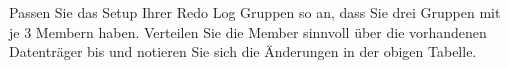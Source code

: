       \item Passen Sie das Setup Ihrer Redo Log Gruppen so an, dass Sie drei Gruppen mit je 3 Membern haben. Verteilen Sie die Member sinnvoll \"uber die vorhandenen Datentr\"ager  bis  und notieren Sie sich die \"Anderungen in der obigen Tabelle.
